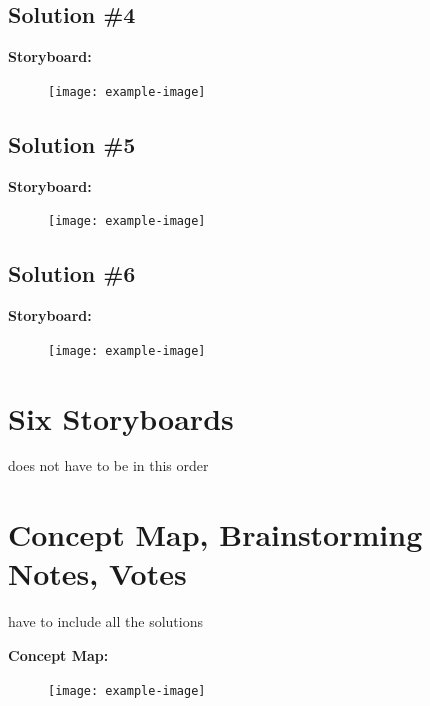 \documentclass[a4paper,10pt,oneside]{scrreprt}
\begin{document}
		\subsection{Solution \#4}
		
			\noindent \textbf{Storyboard:}\\
			
			\begin{figure}[H]
				\centering
				\texttt{[image: example-image]}
			\end{figure}
		
		\subsection{Solution \#5}
		
			\noindent \textbf{Storyboard:}\\
			
			\begin{figure}[H]
				\centering
				\texttt{[image: example-image]}
			\end{figure}
		
		\subsection{Solution \#6}
		
			\noindent \textbf{Storyboard:}\\
			
			\begin{figure}[H]
				\centering
				\texttt{[image: example-image]}
			\end{figure}
		
		\bigskip
		
	\section{Six Storyboards}
		does not have to be in this order
		
	\section{Concept Map, Brainstorming Notes, Votes}
		have to include all the solutions
		
			\noindent \textbf{Concept Map:}\\
			
			\begin{figure}[H]
				\centering
				\texttt{[image: example-image]}
			\end{figure}
		
\end{document}
